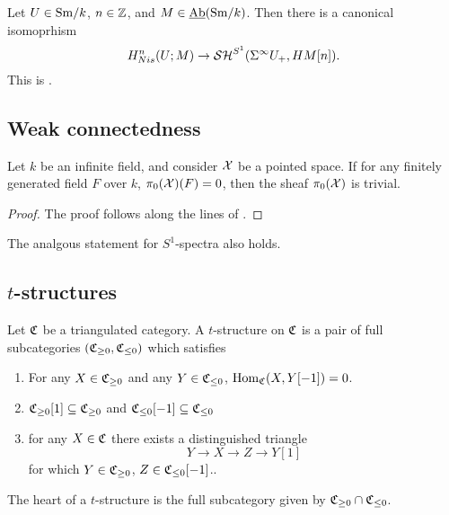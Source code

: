 \documentclass{amsart}%
\begin{document}
\begin{proposition}
  Let $U \in \mathrm{Sm}/k$, $n\in \mathbb{Z}$, and $M \in \operatorname{\underline{Ab}}(\mathrm{Sm}/k)$. Then there
  is a canonical isomoprhism
  \begin{equation*}
    H^n_{Nis}(U; M) \to \mathcal{SH}^{S^1}(\Sigma^{\infty}U_+, HM[n]).
  \end{equation*}
  This is \cite[Lemma 3.2.3]{Mor05}.
\end{proposition}


\subsection{Weak connectedness}

\begin{proposition}
  \label{check-fields}
  Let $k$ be an infinite field, and consider $\mathcal{X}$ be a pointed
  space. If for any finitely generated field $F$ over $k$,
  $\pi_0(\mathcal{X})(F) = 0$, then the sheaf $\pi_0(\mathcal{X})$ is trivial.
\end{proposition}

\begin{proof}
  The proof follows along the lines of \cite[Lemma 6.1.3]{Mor05}.
\end{proof}

\begin{remark}
  The analgous statement for $S^1$-spectra also holds. 
\end{remark}

\subsection{$t$-structures}

\begin{definition}
  Let $\mathfrak{C}$ be a triangulated category. A $t$-structure on $\mathfrak{C}$
  is a pair of full subcategories $(\mathfrak{C}_{\geq 0}, \mathfrak{C}_{\leq 0})$
  which satisfies 
  \begin{enumerate}
      \item For any $X \in \mathfrak{C}_{\geq 0}$ and any
    $ Y \in \mathfrak{C}_{\leq 0}$, $\operatorname{Hom}_{\mathfrak{C}}(X, Y[-1])=0$.
      \item $\mathfrak{C}_{\geq 0}[1] \subseteq \mathfrak{C}_{\geq 0}$ and
    $\mathfrak{C}_{\leq 0}[-1] \subseteq \mathfrak{C}_{\leq 0}$

      \item for any $X \in \mathfrak{C}$ there exists a distinguished triangle 
    \begin{equation*}
      Y \to X \to Z \to Y[1]
    \end{equation*}
    for which $Y \in \mathfrak{C}_{\geq 0}$, $Z\in \mathfrak{C}_{\leq 0}[-1]$..
  \end{enumerate}

  The heart of a $t$-structure is the full subcategory given by
  $\mathfrak{C}_{\geq 0} \cap \mathfrak{C}_{\leq 0}$. 
\end{definition}
\end{document}
